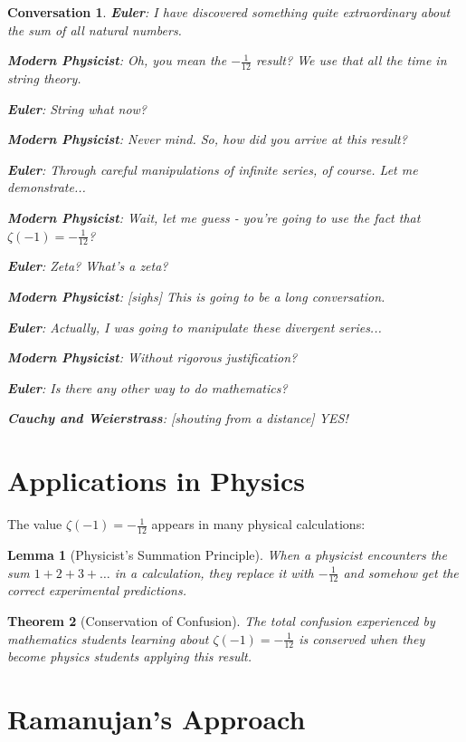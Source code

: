 \documentclass{article}
\newtheorem{theorem}{Theorem}
\newtheorem{lemma}[theorem]{Lemma}
\newtheorem{conversation}{Conversation}
\begin{document}
\begin{conversation}
\textbf{Euler}: I have discovered something quite extraordinary about the sum of all natural numbers.

\textbf{Modern Physicist}: Oh, you mean the $-\frac{1}{12}$ result? We use that all the time in string theory.

\textbf{Euler}: String what now? 

\textbf{Modern Physicist}: Never mind. So, how did you arrive at this result?

\textbf{Euler}: Through careful manipulations of infinite series, of course. Let me demonstrate...

\textbf{Modern Physicist}: Wait, let me guess - you're going to use the fact that $\zeta(-1) = -\frac{1}{12}$?

\textbf{Euler}: Zeta? What's a zeta?

\textbf{Modern Physicist}: [sighs] This is going to be a long conversation.

\textbf{Euler}: Actually, I was going to manipulate these divergent series... 

\textbf{Modern Physicist}: Without rigorous justification?

\textbf{Euler}: Is there any other way to do mathematics?

\textbf{Cauchy and Weierstrass}: [shouting from a distance] YES!
\end{conversation}

\section{Applications in Physics}

The value $\zeta(-1) = -\frac{1}{12}$ appears in many physical calculations:

\begin{lemma}[Physicist's Summation Principle]
    When a physicist encounters the sum $1 + 2 + 3 + \ldots$ in a calculation, they replace it with $-\frac{1}{12}$ and somehow get the correct experimental predictions.
\end{lemma}

\begin{theorem}[Conservation of Confusion]
    The total confusion experienced by mathematics students learning about $\zeta(-1) = -\frac{1}{12}$ is conserved when they become physics students applying this result.
\end{theorem}

\section{Ramanujan's Approach}
\end{document}
